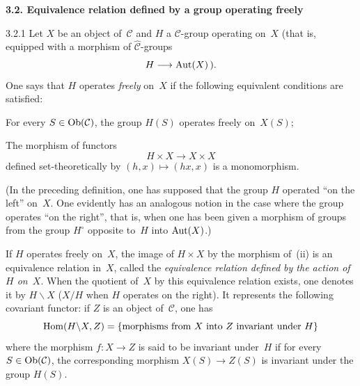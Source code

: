 \par{}
\noindent\textbf{3.2. Equivalence relation defined by a group operating freely}\label{IV.sec.3.2}
\par{}

\begin{definition}{3.2.1}
\label{IV.3.2.1}
Let \(X\) be an object of~\(\mathcal{C}\) and \(H\) a \(\mathcal{C}\)-group operating
on~\(X\) (that is, equipped with a morphism of
\(\widehat{\mathcal{C}}\)-groups
\[
H\longrightarrow\operatorname{Aut}(X)\,).
\]
One says that \(H\) operates \emph{freely} on~\(X\) if the following equivalent
conditions are satisfied:
\begin{enumeratei}
\item For every \(S\in\operatorname{Ob}(\mathcal{C})\), the group \(H(S)\) operates freely
on~\(X(S)\);
\item The morphism of functors
\[
H\times X\longrightarrow X\times X
\]
defined set-theoretically by \((h,x)\mapsto(hx,x)\) is a monomorphism.
\end{enumeratei}
(In the preceding definition, one has supposed that the group \(H\) operated
``on the left'' on~\(X\). One evidently has an analogous notion in the case
where the group operates ``on the right'', that is, when one has been given
a morphism of groups from the group \(H^{\circ}\) opposite to~\(H\) into
\(\operatorname{Aut}(X)\).)
\end{definition}

If \(H\) operates freely on~\(X\), the image of \(H\times X\) by the morphism
of~(ii) is an equivalence relation in~\(X\), called the \emph{equivalence
relation defined by the action of~\(H\) on~\(X\)}. When the quotient of~\(X\)
by this equivalence relation exists, one denotes it by \(H\backslash X\)
(\(X/H\) when \(H\) operates on the right). It represents the following
covariant functor: if \(Z\) is an object of~\(\mathcal{C}\), one has
\[
\operatorname{Hom}(H\backslash X,Z)
=\{\text{morphisms from \(X\) into \(Z\) invariant under \(H\)}\}
\]
where the morphism \(f\colon X\to Z\) is said to be invariant under~\(H\) if
for every \(S\in\operatorname{Ob}(\mathcal{C})\), the corresponding morphism
\(X(S)\to Z(S)\) is invariant under the group \(H(S)\).

